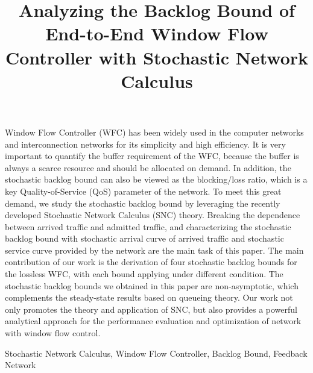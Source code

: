 \documentclass[paper]{ieice}
\title{Analyzing the Backlog Bound of End-to-End Window Flow Controller with Stochastic Network Calculus}
\begin{document}
\maketitle
\begin{summary}
Window Flow Controller (WFC) has been widely used in the computer networks and interconnection networks for its simplicity and high efficiency. It is very important to quantify the buffer requirement of the WFC, because the buffer is always a scarce resource and should be allocated on demand. In addition, the stochastic backlog bound can also be viewed as the blocking/loss ratio, which is a key Quality-of-Service (QoS) parameter of the network. To meet this great demand, we study the stochastic backlog bound by leveraging the recently developed Stochastic Network Calculus (SNC) theory. Breaking the dependence between arrived traffic and admitted traffic, and characterizing the stochastic backlog bound with stochastic arrival curve of arrived traffic and stochastic service curve provided by the network are the main task of this paper. The main contribution of our work is the derivation of four stochastic backlog bounds for the lossless WFC, with each bound applying under different condition. The stochastic backlog bounds we obtained in this paper are non-asymptotic, which complements the steady-state results based on queueing theory. Our work not only promotes the theory and application of SNC, but also provides a powerful analytical approach for the performance evaluation and optimization of network with window flow control.
\end{summary}
\begin{keywords}
Stochastic Network Calculus, Window Flow Controller, Backlog Bound, Feedback Network
\end{keywords}
\end{document}
